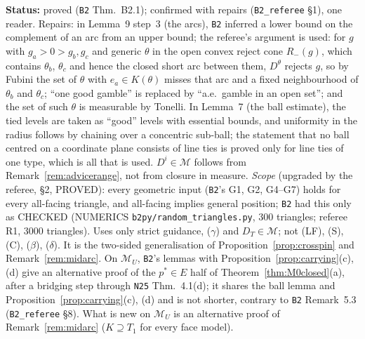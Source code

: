 \documentclass[11pt]{article}
\theoremstyle{definition}
\theoremstyle{remark}
\newcommand{\M}{\mathcal M}
\newcommand{\src}[1]{\texttt{#1}}
\newcommand{\status}[1]{\par\smallskip\noindent\textbf{Status:} #1\par\smallskip}
\begin{document}
\status{proved (\src{B2} Thm.~B2.1); confirmed with repairs (\src{B2\_referee} \S1), one reader. Repairs: in Lemma~9 step~3 (the arcs), \src{B2} inferred a lower bound on the complement of an arc from an upper bound; the referee's argument is used: for $g$ with $g_a>0>g_b,g_c$ and generic $\theta$ in the open convex reject cone $R_-(g)$, which contains $\theta_b$, $\theta_c$ and hence the closed short arc between them, $D^\theta$ rejects $g$, so by Fubini the set of $\theta$ with $e_a\in K(\theta)$ misses that arc and a fixed neighbourhood of $\theta_b$ and $\theta_c$; ``one good gamble'' is replaced by ``a.e.\ gamble in an open set''; and the set of such $\theta$ is measurable by Tonelli. In Lemma~7 (the ball estimate), the tied levels are taken as ``good'' levels with essential bounds, and uniformity in the radius follows by chaining over a concentric sub-ball; the statement that no ball centred on a coordinate plane consists of line ties is proved only for line ties of one type, which is all that is used. $D^i\in\M$ follows from Remark~\ref{rem:advicerange}, not from closure in measure. \emph{Scope} (upgraded by the referee, \S2, PROVED): every geometric input (\src{B2}'s G1, G2, G4--G7) holds for every all-facing triangle, and all-facing implies general position; \src{B2} had this only as CHECKED (NUMERICS \src{b2py/random\_triangles.py}, 300 triangles; referee R1, 3000 triangles). Uses only strict guidance, ($\gamma$) and $D_T\in\M$; not (LF), (S), (C), ($\beta$), ($\delta$). It is the two-sided generalisation of Proposition~\ref{prop:crosspin} and Remark~\ref{rem:midarc}. On $\M_U$, \src{B2}'s lemmas with Proposition~\ref{prop:carrying}(c), (d) give an alternative proof of the $p^*\in E$ half of Theorem~\ref{thm:M0closed}(a), after a bridging step through \src{N25} Thm.~4.1(d); it shares the ball lemma and Proposition~\ref{prop:carrying}(c), (d) and is not shorter, contrary to \src{B2} Remark~5.3 (\src{B2\_referee} \S8). What is new on $\M_U$ is an alternative proof of Remark~\ref{rem:midarc} ($K\supseteq T_1$ for every face model).}
\end{document}
